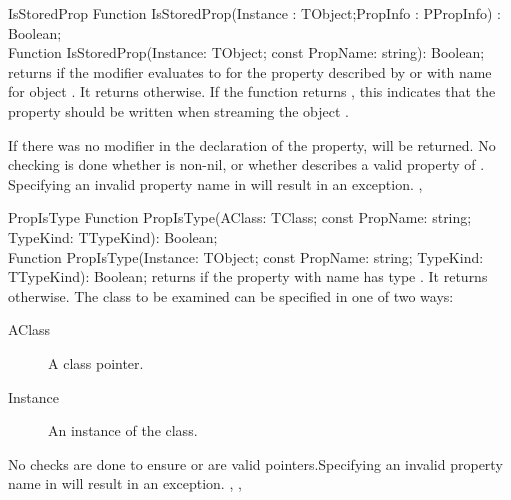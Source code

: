 
\begin{function}{IsStoredProp}
\Declaration
Function IsStoredProp(Instance : TObject;PropInfo : PPropInfo) : Boolean;\\
Function IsStoredProp(Instance: TObject; const PropName: string): Boolean; 
\Description
{} returns  if the  modifier evaluates
to  for the property described by  or with name
 for object . 
It returns  otherwise. If the function returns
, this indicates that the property should be written when
streaming the object .

If there was no  modifier in the declaration of the property, 
 will be returned. 
\Errors
No checking is done whether  is non-nil, or whether
 describes a valid property of .
Specifying an invalid property name in  will result in an
 exception.                                                 
\SeeAlso
{}, 
\end{function}


\begin{function}{PropIsType}
\Declaration
Function PropIsType(AClass: TClass; 
                    const PropName: string; TypeKind: TTypeKind): Boolean;\\
Function PropIsType(Instance: TObject; 
                    const PropName: string; TypeKind: TTypeKind): Boolean;              
\Description
{} returns  if the property with name 
has type . It returns  otherwise. The class to be
examined can be specified in one of two ways:
\begin{description}
\item[AClass] A class pointer. 
\item[Instance] An instance of the class.
\end{description}
\Errors
No checks are done to ensure  or  are valid
pointers.Specifying an invalid property name in  will result
in an  exception.                                                 
\SeeAlso
{}, , 
\end{function}


